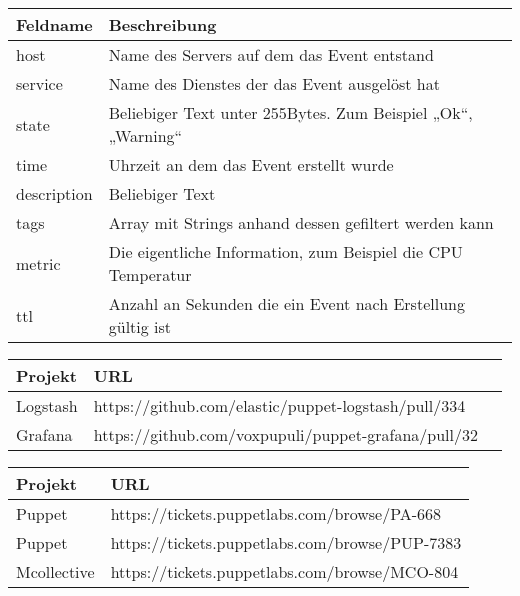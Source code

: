 \begin{center}
  \begin{tabular}{ll}
  \toprule
  Feldname    & Beschreibung                                                 \\
  \midrule
  host        & Name des Servers auf dem das Event entstand                  \\
  service     & Name des Dienstes der das Event ausgelöst hat                \\
  state       & Beliebiger Text unter 255Bytes. Zum Beispiel „Ok“, „Warning“ \\
  time        & Uhrzeit an dem das Event erstellt wurde                      \\
  description & Beliebiger Text                                              \\
  tags        & Array mit Strings anhand dessen gefiltert werden kann        \\
  metric      & Die eigentliche Information, zum Beispiel die CPU Temperatur \\
  ttl         & Anzahl an Sekunden die ein Event nach Erstellung gültig ist  \\
  \bottomrule
\end{tabular}
\label{tbl:riemann}
\end{center}

\begin{center}
  \begin{tabular}{lll}
  \toprule
    Projekt  & URL                                                 \\
  \midrule
    Logstash & https://github.com/elastic/puppet-logstash/pull/334 \\
    Grafana  & https://github.com/voxpupuli/puppet-grafana/pull/32 \\
  \bottomrule
\end{tabular}
\label{tbl:fossprs}
\end{center}

\begin{center}
  \begin{tabular}{ll}
  \toprule
    Projekt     & URL                                            \\
  \midrule
    Puppet      & https://tickets.puppetlabs.com/browse/PA-668   \\
    Puppet      & https://tickets.puppetlabs.com/browse/PUP-7383 \\
    Mcollective & https://tickets.puppetlabs.com/browse/MCO-804  \\
  \bottomrule
\end{tabular}
\label{tbl:fossissues}
\end{center}
